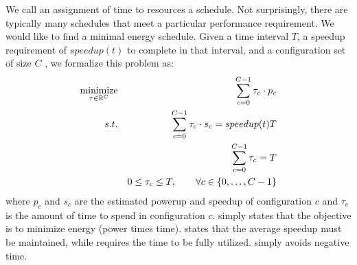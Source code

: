 We call an assignment of time to resources a schedule.  Not
surprisingly, there are typically many schedules that meet a
particular performance requirement.  We would like to find a minimal
energy schedule. Given a time interval $T$, a speedup requirement of $speedup(t)$ to
complete in that interval, and a configuration set of size $C$ , we
formalize this problem as:
\begin{eqnarray}
  \minimize_{\mathbf{\tau} \in \R^{C}} && \sum_{c=0}^{C-1} \tau_c \cdot p_c \label{eqn:power}  \\
  \st %
  && \sum_{c=0}^{C-1} \tau_c \cdot s_c =  speedup(t)T \label{eqn:work} \\
  && \sum_{c=0}^{C-1} \tau_c =  T \label{eqn:deadline} \\
  && 0 \le \tau_c \le T, \qquad \forall c \in \{0,\ldots,C-1\} \label{eqn:time}
\end{eqnarray}
where $p_c$ and $s_c$ are the estimated powerup and speedup of
configuration $c$ and $\tau_c$ is the amount of time to spend in
configuration $c$.   simply states that the objective is
to minimize energy (power times time).   states that the
average speedup must be maintained, while  requires the time to be fully utilized.   simply avoids negative time.


